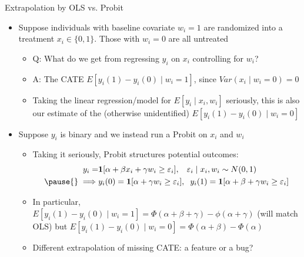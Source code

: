 \documentclass[11pt,english]{beamer}
\begin{document}
\begin{frame}{Extrapolation by OLS vs. Probit}
\begin{itemize}
\item Suppose individuals with baseline covariate $w_i=1$ are randomized into a treatment $x_i\in\{0,1\}$. Those with $w_i=0$ are all untreated\smallskip\pause{}
\begin{itemize}
\item Q: What do we get from regressing $y_i$ on $x_i$ controlling for $w_i$?\smallskip\pause{}
\item A: The CATE $E[y_i(1)-y_i(0)\mid w_i=1]$, since $Var(x_i\mid w_i=0)=0$\smallskip\pause{}
\item Taking the linear regression/model for $E[y_i\mid x_i,w_i]$ seriously, this is also our estimate of the (otherwise unidentified) $E[y_i(1)-y_i(0)\mid w_i=0]$
\end{itemize}\bigskip\pause{}
\item Suppose $y_i$ is binary and we instead run a Probit on $x_i$ and $w_i$\smallskip
\begin{itemize}
\item Taking it seriously, Probit structures potential outcomes:
\begin{align*}
 y_i=& \mathbf{1}[\alpha+\beta x_i+\gamma w_i\ge\varepsilon_i],\hspace{0.3cm} \varepsilon_i\mid x_i,w_i\sim N(0,1) \\
\pause{} \implies &  y_i(0)=\mathbf{1}[\alpha+\gamma w_i\ge \varepsilon_i],\hspace{0.2cm}y_i(1)=\mathbf{1}[\alpha+\beta + \gamma w_i\ge \varepsilon_i]
\end{align*}\pause{}\vspace{-0.2cm}
\item In particular, $E[y_i(1)-y_i(0)\mid w_i=1]=\Phi(\alpha+\beta+\gamma)-\phi(\alpha+\gamma)$ (will match OLS) but $E[y_i(1)-y_i(0)\mid w_i=0]=\Phi(\alpha+\beta)-\Phi(\alpha)$\smallskip\pause{}
\item Different extrapolation of missing CATE: a feature or a bug?
\end{itemize}
\end{itemize}
\end{frame}
\end{document}
